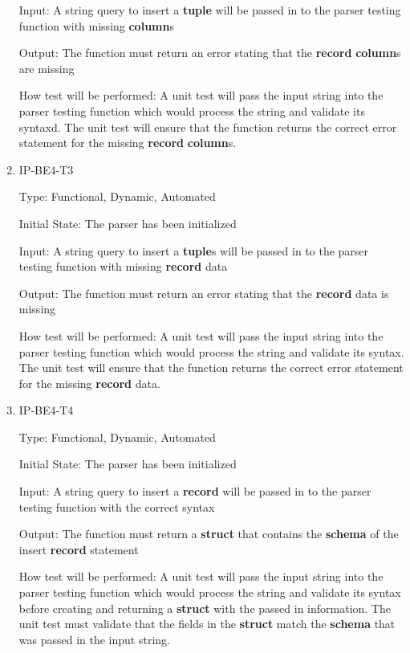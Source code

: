 \documentclass[12pt, titlepage]{article}
\begin{document}
\begin{enumerate}
Input: A string query to insert a \textbf{tuple} will be passed in to the parser testing function with missing \textbf{column}s
					
Output: The function must return an error stating that the \textbf{record} \textbf{column}s are missing
					
How test will be performed: A unit test will pass the input string into the parser testing function which would process the string and validate its syntaxd. The unit test will ensure that the function returns the correct error statement for the missing \textbf{record} \textbf{column}s.

\item{IP-BE4-T3}

Type: Functional, Dynamic, Automated
					
Initial State: The parser has been initialized
					
Input: A string query to insert a \textbf{tuple}s will be passed in to the parser testing function with missing \textbf{record} data
					
Output: The function must return an error stating that the \textbf{record} data is missing
					
How test will be performed: A unit test will pass the input string into the parser testing function which would process the string and validate its syntax. The unit test will ensure that the function returns the correct error statement for the missing \textbf{record} data.

\item{IP-BE4-T4}

Type: Functional, Dynamic, Automated
					
Initial State: The parser has been initialized
					
Input: A string query to insert a \textbf{record} will be passed in to the parser testing function with the correct syntax
					
Output: The function must return a \textbf{struct} that contains the \textbf{schema} of the insert \textbf{record} statement
					
How test will be performed: A unit test will pass the input string into the parser testing function which would process the string and validate its syntax before creating and returning a \textbf{struct} with the passed in information. The unit test must validate that the fields in the \textbf{struct} match the \textbf{schema} that was passed in the input string.


\end{enumerate}
\end{document}
